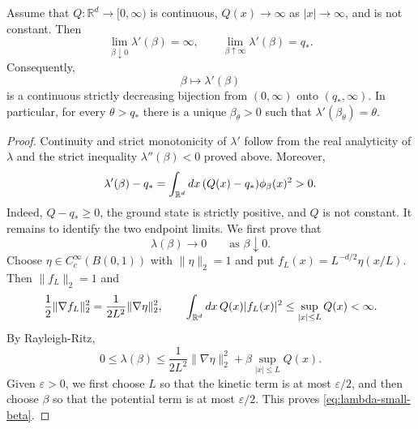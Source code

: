 \documentclass[10pt,a4paper]{amsart}
\def\de{{\rm d}}
\begin{document}
\begin{lemma}
\label{lem:range-constraint-coupling}
Assume that $Q\colon\mathbb R^d\to[0,\infty)$ is continuous,
$Q(x)\to\infty$ as $|x|\to\infty$, and is not constant.  Then
\[
    \lim_{\beta\downarrow0}\lambda'(\beta)=\infty,
    \qquad
    \lim_{\beta\uparrow\infty}\lambda'(\beta)=q_*.
\]
Consequently,
\[
    \beta\longmapsto\lambda'(\beta)
\]
is a continuous strictly decreasing bijection from $(0,\infty)$ onto
$(q_*,\infty)$.  In particular, for every $\theta>q_*$ there is a unique
$\beta_\theta>0$ such that $\lambda'(\beta_\theta)=\theta$.
\end{lemma}

\begin{proof}
Continuity and strict monotonicity of $\lambda'$ follow from the real
analyticity of $\lambda$ and the strict inequality $\lambda''(\beta)<0$
proved above.  Moreover,
\[
    \lambda'(\beta)-q_*
    =\int_{\mathbb R^d}\de x \, (Q(x)-q_*)\phi_\beta(x)^2>0.
\]
Indeed, $Q-q_*\geq0$, the ground state is strictly positive, and $Q$ is not
constant.  It remains to identify the two endpoint limits.
We first prove that
\begin{equation}
    \lambda(\beta)\longrightarrow0
    \qquad\text{as }\beta\downarrow0.
\label{eq:lambda-small-beta}
\end{equation}
Choose $\eta\in C_c^\infty(B(0,1))$ with $\|\eta\|_2=1$ and put
$f_L(x)=L^{-d/2}\eta(x/L)$.
Then $\|f_L\|_2=1$ and
\[
    \frac12\|\nabla f_L\|_2^2
    =\frac{1}{2L^2}\|\nabla\eta\|_2^2,
    \qquad
    \int_{\mathbb R^d} \de x \, Q(x)|f_L(x)|^2
    \leq \sup_{|x|\leq L}Q(x)<\infty.
\]
By Rayleigh-Ritz,
\[
    0\leq\lambda(\beta)
    \leq \frac{1}{2L^2}\|\nabla\eta\|_2^2
       +\beta\sup_{|x|\leq L}Q(x).
\]
Given $\varepsilon>0$, we first choose $L$ so that the kinetic term is at
most $\varepsilon/2$, and then choose $\beta$ so that the potential term is
at most $\varepsilon/2$.  This proves \eqref{eq:lambda-small-beta}.


\end{proof}
\end{document}
